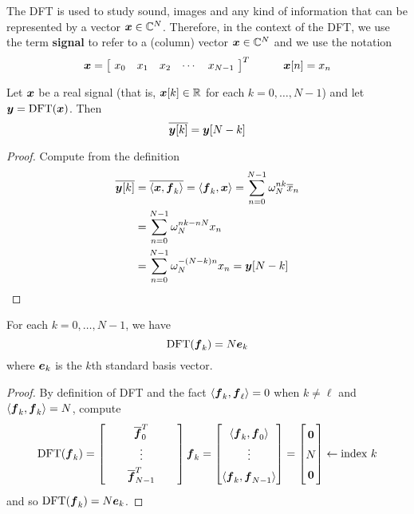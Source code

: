 \begin{definition}
The DFT is used to study sound, images and any kind of information that can be represented by a vector $\boldsymbol{x} \in \mathbb{C}^N$. Therefore, in the context of the DFT, we use the term {\bf signal} to refer to a (column) vector $\boldsymbol{x} \in \mathbb{C}^N$ and we use the notation
$$
\bs{x} = \begin{bmatrix} \ x_0 & x_1 & x_2 & \cdots & x_{N-1} \ \end{bmatrix}^T
\hspace{10mm}
\bs{x}[n] = x_n
$$
\end{definition}

\begin{proposition}
Let $\boldsymbol{x}$ be a real signal (that is, $\boldsymbol{x}[k] \in \mathbb{R}$ for each $k=0,\dots,N-1$) and let $\boldsymbol{y} = \mathrm{DFT}(\boldsymbol{x})$. Then
$$
\overline{\boldsymbol{y}[k]} = \boldsymbol{y}[N-k]
$$

\begin{proof}
Compute from the definition
\begin{align*}
\overline{\boldsymbol{y}[k]} &= \overline{\langle \boldsymbol{x} , \boldsymbol{f}_k \rangle} =  \langle \boldsymbol{f}_k , \boldsymbol{x} \rangle = \sum_{n=0}^{N-1} \omega_N^{nk} \overline{x}_n \\
&= \sum_{n=0}^{N-1} \omega_N^{nk-nN} x_n \\
&= \sum_{n=0}^{N-1} \omega_N^{-(N-k)n} x_n = \boldsymbol{y}[N-k]
\end{align*}

\end{proof}
\end{proposition}

\begin{proposition}
For each $k=0,\dots,N-1$, we have
$$
\mathrm{DFT}(\boldsymbol{f}_k) = N \boldsymbol{e}_k
$$
where $\boldsymbol{e}_k$ is the $k$th standard basis vector.

\begin{proof}
By definition of DFT and the fact $\langle \boldsymbol{f}_k , \boldsymbol{f}_{\ell} \rangle = 0$ when $k \not= \ell$ and $\langle \boldsymbol{f}_k , \boldsymbol{f}_k \rangle = N$, compute
$$
\mathrm{DFT}(\bs{f}_k) = 
\renewcommand{\arraystretch}{1.5}
\begin{bmatrix} & & \overline{\bs{f}}^T_0 & & \\ & & \vdots & & \\ & & \overline{\bs{f}}^T_{N-1} & & \end{bmatrix} \bs{f}_k
=
\begin{bmatrix} \langle \bs{f}_k , \bs{f}_0 \rangle \\ \vdots \\ \langle \bs{f}_k , \bs{f}_{N-1} \rangle \end{bmatrix}
=
\begin{bmatrix} \bs{0} \\ N \\ \bs{0} \end{bmatrix} \leftarrow \text{index } k
\renewcommand{\arraystretch}{1}
$$
and so $\mathrm{DFT}(\boldsymbol{f}_k) = N \boldsymbol{e}_k$.
\end{proof}
\end{proposition}

